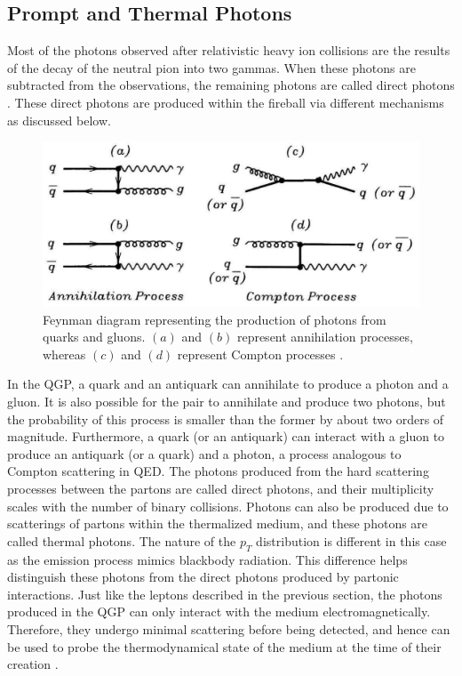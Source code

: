 \subsection{Prompt and Thermal Photons}
Most of the photons observed after relativistic heavy ion collisions are the results of the decay of the neutral pion into two gammas. When these photons are subtracted from the observations, the remaining photons are called direct photons \cite{PAQUET2016409}. These direct photons are produced within the fireball via different mechanisms as discussed below.
\begin{figure}[h]
  \centering
  \includegraphics[width=6.5in]{figures/directPhotons.PNG}
  \caption{Feynman diagram representing the production of photons from quarks and gluons. $(a)$ and $(b)$ represent annihilation processes, whereas $(c)$ and $(d)$ represent Compton processes \cite{wong1994introduction}.}\label{fig:directPhotons}
\end{figure}

In the QGP, a quark and an antiquark can annihilate to produce a photon and a gluon. It is also possible for the pair to annihilate and produce two photons, but the probability of this process is smaller than the former by about two orders of magnitude. Furthermore, a quark (or an antiquark) can interact with a gluon to produce an antiquark (or a quark) and a photon, a process analogous to Compton scattering in QED. The photons produced from the hard scattering processes between the partons are called direct photons, and their multiplicity scales with the number of binary collisions. Photons can also be produced due to scatterings of partons within the thermalized medium, and these photons are called thermal photons. The nature of the $p_{T}$ distribution is different in this case as the emission process mimics blackbody radiation. This difference helps distinguish these photons from the direct photons produced by partonic interactions. Just like the leptons described in the previous section, the photons produced in the QGP can only interact with the medium electromagnetically. Therefore, they undergo minimal scattering before being detected, and hence can be used to probe the thermodynamical state of the medium at the time of their creation \cite{wong1994introduction,PAQUET2016409,Wilde:2012wc}.

